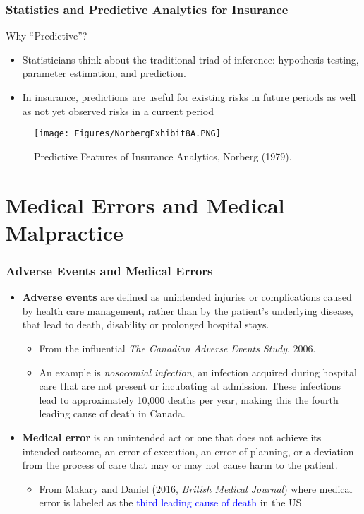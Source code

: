 \documentclass[serif,10pt]{beamer}
\begin{document}
\begin{frame}
\frametitle{Statistics and Predictive Analytics for Insurance}
Why ``Predictive''? \pause
\vspace{-.05in}
  \begin{itemize}
 \item Statisticians think about the traditional triad of inference: hypothesis testing, parameter estimation, and prediction.
 \item In insurance, predictions are useful for existing risks in future periods as well as not yet observed risks in a current period
 \end{itemize}
\vspace{-.1in}
   \begin{figure}[htp]
\begin{center}
       \caption{\label{F:PredAnalytics}\small Predictive Features of Insurance Analytics, Norberg (1979).}
\vspace{-.2in}
    \texttt{[image: Figures/NorbergExhibit8A.PNG]}
\end{center}
\end{figure}
\end{frame}


\section{Medical Errors and Medical Malpractice}

\begin{frame}%
\frametitle{Adverse Events and Medical Errors}
  \begin{itemize}
\item \textbf{Adverse events} are defined as unintended injuries or complications caused by health care management, rather than by the patient's underlying disease, that lead to death, disability or prolonged hospital stays.
 \begin{itemize}\item From the influential \textcolor{bleudefrance}{\textit{The Canadian Adverse Events Study}, 2006}.
\item An example is \textit{nosocomial infection}, an infection acquired during hospital care that are not present or incubating at admission. These infections lead to approximately 10,000 deaths per year, making this the fourth leading cause of death in Canada. \end{itemize}
\item \textbf{Medical error} is an unintended act or one that does not achieve its intended outcome, an error of execution, an error of planning, or a deviation from the process of care that may or may not cause harm to the patient.
 \begin{itemize}\item From \textcolor{bleudefrance}{Makary and Daniel (2016, \textit{British Medical Journal})} where medical error is labeled as the \textcolor{blue}{third leading cause of death} in the US\end{itemize}

\end{itemize}
\end{frame}
\end{document}
